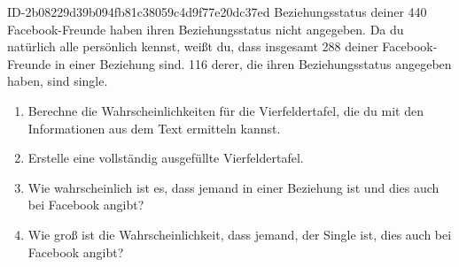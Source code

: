 \begin{exercise}
      {ID-2b08229d39b094fb81c38059c4d9f77e20dc37ed}
      {Beziehungsstatus}
  \ifproblem{} deiner 440 Facebook-Freunde haben ihren Beziehungsstatus nicht angegeben.
    Da du natürlich alle persönlich kennst, weißt du, dass insgesamt 288 deiner
    Face\-book-Freunde in einer Beziehung sind. 116 derer, die ihren Beziehungsstatus
    angegeben haben, sind single.
    \begin{enumerate}
      \item Berechne die Wahrscheinlichkeiten für die Vierfeldertafel,
            die du mit den Informationen aus dem Text ermitteln kannst.
      \item Erstelle eine vollständig ausgefüllte Vierfeldertafel.
      \item Wie wahrscheinlich ist es, dass jemand in einer Beziehung
            ist und dies auch bei Facebook angibt?
      \item Wie groß ist die Wahrscheinlichkeit, dass jemand, der Single ist,
            dies auch bei Facebook angibt?
    \end{enumerate}
  \fi
\end{exercise}
